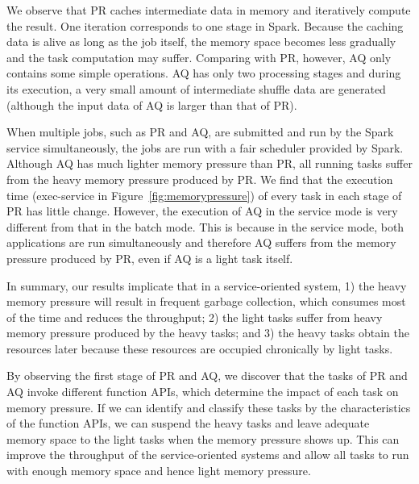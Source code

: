 We observe that PR caches intermediate data in memory and iteratively compute the result. One iteration corresponds to one stage in Spark. Because the caching data is alive as long as the job itself, the memory space becomes less gradually
and the task computation may suffer. 
Comparing with PR, however, AQ only contains some simple operations. AQ has only two processing stages and during its execution, a very small amount of intermediate shuffle data are generated (although the input data of AQ is larger than that of PR). 

When multiple jobs, such as PR and AQ, are submitted and run by the Spark service simultaneously, the jobs are run with a fair scheduler provided by Spark. Although AQ has much lighter memory pressure than PR, all running tasks suffer from the heavy memory pressure produced by PR. We find that the execution time (exec-service in Figure~\ref{fig:memorypressure}) of every task in each stage of PR has little change. 
However, the execution of AQ in the service mode is very different from that in the batch mode. This is because in the service mode, both applications are run simultaneously and therefore AQ suffers from the memory pressure produced by PR, even if AQ is a light task itself.

In summary, our results implicate that in a service-oriented system, 1) the heavy memory pressure will result in frequent garbage collection, which consumes most of the time and reduces the throughput; 2) the light tasks suffer from heavy memory pressure produced by the heavy tasks; and 3) the heavy tasks obtain the resources later because these resources are occupied chronically by light tasks.

By observing the first stage of PR and AQ, we discover that the tasks of PR and AQ invoke different function APIs, which determine the impact of each task on memory pressure. If we can identify and classify these tasks by the characteristics of the function APIs, we can suspend the heavy tasks and leave adequate memory space to the light tasks when the memory pressure shows up. This can improve the throughput of the service-oriented systems and allow all tasks to run with enough memory space and hence light memory pressure. 
  
